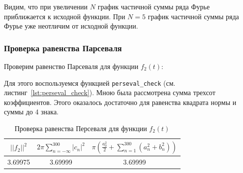 Видим, что при увеличении $N$ график частичной суммы ряда Фурье приближается к исходной функции. При $N = 5$ график частичной суммы ряда Фурье уже неотличим от исходной функции.

\FloatBarrier
\subsubsection{Проверка равенства Парсеваля}

Проверим равенство Парсеваля для функции $f_2(t)$:

Для этого воспользуемся функцией \texttt{perseval\_check} (см. листинг~\ref{lst:perseval_check}).
Мною была рассмотрена сумма трехсот коэффициентов. Этого оказалось достаточно для равенства квадрата нормы и суммы до 4 знака. 

\begin{table}[ht!]
    \centering
    \begin{tabular}{|c|c|c|}
        \hline
        $||f_2||^2$ & $2\pi \sum\limits_{n = -\infty}^{300} |c_n|^2$ & $\pi \left(\frac{a_0^2}{2} + \sum\limits_{n = 1}^{300} (a_n^2 + b_n^2)\right)$\\
        \hline
        3.69975 & 3.69999 & 3.69999 \\
        \hline
    \end{tabular}
    \caption{Проверка равенства Персеваля для функции $f_2(t)$}
    \label{tab:func_2_pers}
\end{table}
